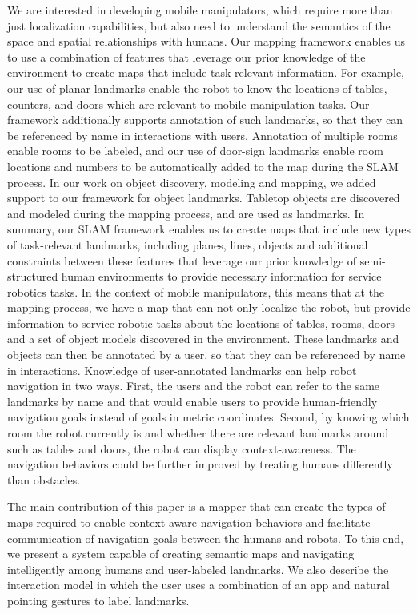 \documentclass[3p]{elsarticle}
\begin{document}
We are interested in developing mobile manipulators, which require more than just localization capabilities, but also need to understand the semantics of the space and spatial relationships with humans. Our mapping framework enables us to use a combination of features that leverage our prior knowledge of the environment to create maps that include task-relevant information. For example, our use of planar landmarks enable the robot to know the locations of tables, counters, and doors which are relevant to mobile manipulation tasks. Our framework additionally supports annotation of such landmarks, so that they can be referenced by name in interactions with users. Annotation of multiple rooms enable rooms to be labeled, and our use of door-sign landmarks enable room locations and numbers to be automatically added to the map during the SLAM process. In our work on object discovery, modeling and mapping, we added support to our framework for object landmarks. Tabletop objects are discovered and modeled during the mapping process, and are used as landmarks. In summary, our SLAM framework enables us to create maps that include new types of task-relevant landmarks, including planes, lines, objects and additional constraints between these features that leverage our prior knowledge of semi-structured human environments to provide necessary information for service robotics tasks. In the context of mobile manipulators, this means that at the mapping process, we have a map that can not only localize the robot, but provide information to service robotic tasks about the locations of tables, rooms, doors and a set of object models discovered in the environment. These landmarks and objects can then be annotated by a user, so that they can be referenced by name in interactions. Knowledge of user-annotated landmarks can help robot navigation in two ways. First, the users and the robot can refer to the same landmarks by name and that would enable users to provide human-friendly navigation goals instead of goals in metric coordinates. Second, by knowing which room the robot currently is and whether there are relevant landmarks around such as tables and doors, the robot can display context-awareness. The navigation behaviors could be further improved by treating humans differently than obstacles.

The main contribution of this paper is a mapper that can create the types of maps required to enable context-aware navigation behaviors and facilitate communication of navigation goals between the humans and robots. To this end, we present a system capable of creating semantic maps and navigating intelligently among humans and user-labeled landmarks. We also describe the interaction model in which the user uses a combination of an app and natural pointing gestures to label landmarks.
\end{document}
